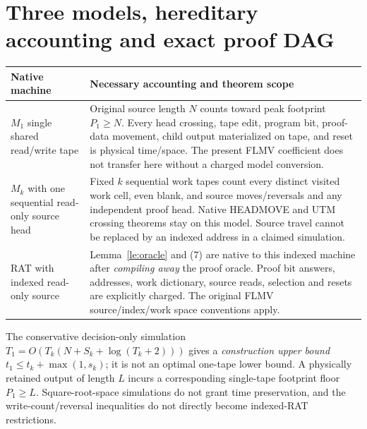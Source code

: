 \documentclass[11pt]{article}
\begin{document}
\section{Three models, hereditary accounting and exact proof DAG}
\begin{center}\small
\begin{tabularx}{.98\linewidth}{p{.17\linewidth}X}
\toprule
Native machine & Necessary accounting and theorem scope\\ \midrule
$M_1$ single shared read/write tape &
Original source length $N$ counts toward peak
footprint $P_1\ge N$. Every head crossing, tape
edit, program bit, proof-data movement, child
output materialized on tape, and reset is physical
time/space. The present FLMV coefficient does not
transfer here without a charged model conversion.\\
$M_k$ with one sequential read-only source head &
Fixed $k$ sequential work tapes count every
distinct visited work cell, even blank, and source
moves/reversals and any independent proof head.
Native HEADMOVE and UTM crossing theorems stay
on this model. Source travel cannot be replaced
by an indexed address in a claimed simulation.\\
RAT with indexed read-only source &
Lemma~\ref{le:oracle} and (7) are native to this
indexed machine after \emph{compiling away} the
proof oracle. Proof bit answers, addresses, work
dictionary, source reads, selection and resets
are explicitly charged. The original FLMV
source/index/work space conventions apply.\\
\bottomrule
\end{tabularx}
\end{center}

The conservative decision-only simulation
$T_1=O(T_k(N+S_k+\log(T_k+2)))$
gives a \emph{construction upper bound}
$t_1\le t_k+\max(1,s_k)$; it is not an
optimal one-tape lower bound. A physically retained
output of length $L$ incurs a corresponding
single-tape footprint floor $P_1\ge L$.
Square-root-space simulations do not grant
time preservation, and the write-count/reversal
inequalities do not directly become indexed-RAT
restrictions.
\end{document}
